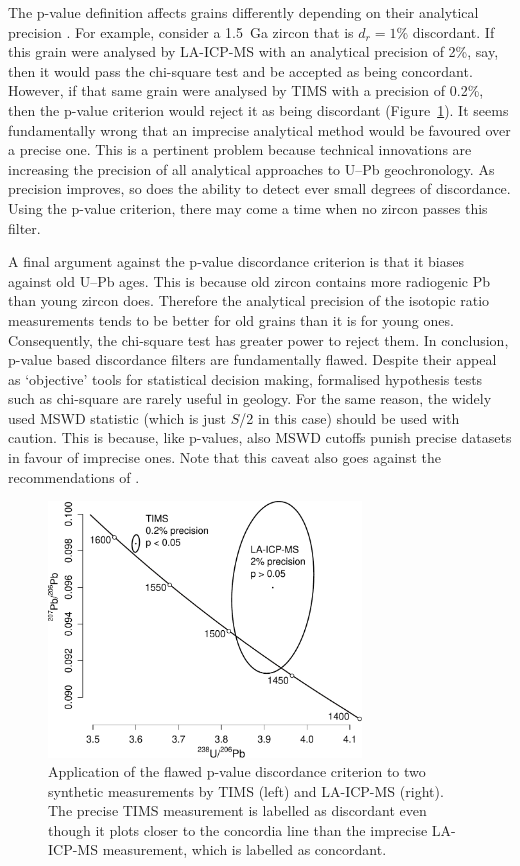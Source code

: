\documentclass{article}
\begin{document}
The p-value definition affects grains differently depending on their
analytical precision \citep{nemchin2005}. For example, consider a
1.5~Ga zircon that is $d_r=1\%$ discordant. If this grain were
analysed by LA-ICP-MS with an analytical precision of 2\%, say, then
it would pass the chi-square test and be accepted as being
concordant. However, if that same grain were analysed by TIMS with a
precision of 0.2\%, then the p-value criterion would reject it as
being discordant (Figure~\ref{fig:TIMSvsLAICPMS}). It seems
fundamentally wrong that an imprecise analytical method would be
favoured over a precise one. This is a pertinent problem because
technical innovations are increasing the precision of all analytical
approaches to U--Pb geochronology.  As precision improves, so does the
ability to detect ever small degrees of discordance. Using the p-value
criterion, there may come a time when no zircon passes this filter.

A final argument against the p-value discordance criterion is that it
biases against old U--Pb ages. This is because old zircon contains
more radiogenic Pb than young zircon does. Therefore the analytical
precision of the isotopic ratio measurements tends to be better for
old grains than it is for young ones. Consequently, the chi-square
test has greater power \citep[\emph{sensu}][]{cohen1992} to reject
them. In conclusion, p-value based discordance filters are
fundamentally flawed. Despite their appeal as `objective' tools for
statistical decision making, formalised hypothesis tests such as
chi-square are rarely useful in geology. For the same reason, the
widely used MSWD \citep[Mean Square of the Weighted
  Deviates,][]{mcintyre1966} statistic (which is just $S$/2 in this
case) should be used with caution. This is because, like p-values,
also MSWD cutoffs punish precise datasets in favour of imprecise
ones. Note that this caveat also goes against the recommendations of
\citet{spencer2016}.

\begin{figure}[t]
  \includegraphics[width=8.3cm]{TIMSvsICPMS.pdf}
  \caption{Application of the flawed p-value discordance criterion
    to two synthetic measurements by TIMS (left) and LA-ICP-MS
    (right).  The precise TIMS measurement is labelled as discordant
    even though it plots closer to the concordia line than the
    imprecise LA-ICP-MS measurement, which is labelled as
    concordant.
  }
  \label{fig:TIMSvsLAICPMS}
\end{figure}
\end{document}
